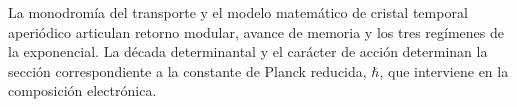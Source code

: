 La monodromía del transporte y el modelo matemático de cristal temporal
aperiódico articulan retorno modular, avance de memoria y los tres
regímenes de la exponencial. La década determinantal y el carácter de
acción determinan la sección correspondiente a la constante de Planck
reducida, \(\hbar\), que interviene en la composición electrónica.
